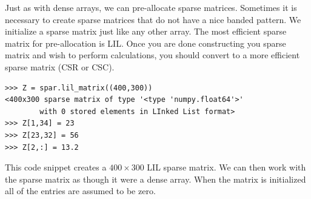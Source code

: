 Just as with dense arrays, we can pre-allocate sparse matrices.
Sometimes it is necessary to create sparse matrices that do not have a nice banded pattern.
We initialize a sparse matrix just like any other array.
The most efficient sparse matrix for pre-allocation is LIL.
Once you are done constructing you sparse matrix and wish to perform calculations,
you should convert to a more efficient sparse matrix (CSR or CSC).
\begin{lstlisting}
>>> Z = spar.lil_matrix((400,300))
<400x300 sparse matrix of type '<type 'numpy.float64'>'
        with 0 stored elements in LInked List format>
>>> Z[1,34] = 23
>>> Z[23,32] = 56
>>> Z[2,:] = 13.2
\end{lstlisting}
This code snippet creates a $400 \times 300$ LIL sparse matrix.
We can then work with the sparse matrix as though it were a dense array.
When the matrix is initialized all of the entries are assumed to be zero. 